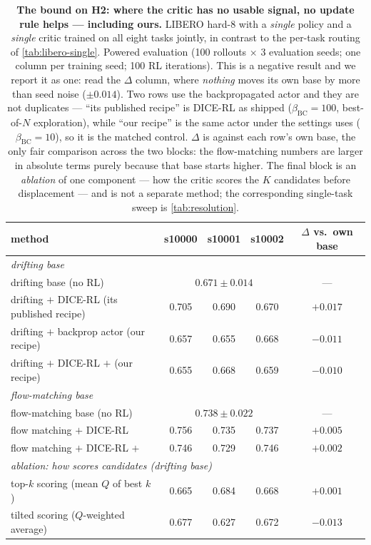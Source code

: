 \begin{table}[h]
\centering
\caption{\textbf{The bound on H2: where the critic has no usable signal,
no update rule helps --- including ours.} LIBERO hard-8 with a
\emph{single} policy and a \emph{single} critic trained on all eight tasks
jointly, in contrast to the per-task routing of \cref{tab:libero-single}.
Powered evaluation (100 rollouts $\times$ 3 evaluation seeds; one column per
training seed; 100 RL iterations). This is a negative result and we report it
as one: read the $\Delta$ column, where \emph{nothing} moves its own base by
more than seed noise ($\pm 0.014$). Two rows use the backpropagated actor and
they are not duplicates --- ``its published recipe'' is DICE-RL as shipped
($\beta_{\mathrm{BC}}{=}100$, best-of-$N$ exploration), while ``our recipe''
is the same actor under the settings \method{} uses
($\beta_{\mathrm{BC}}{=}10$), so it is the matched control. $\Delta$ is
against each row's own base, the only fair comparison across the two blocks:
the flow-matching numbers are larger in absolute terms purely because that
base starts higher. The final block is an \emph{ablation} of one component ---
how the critic scores the $K$ candidates before displacement --- and is not a
separate method; the corresponding single-task sweep is
\cref{tab:resolution}.}
\label{tab:libero}
\small
\begin{tabular}{lcccc}
\toprule
method & s10000 & s10001 & s10002 & $\Delta$ vs.\ own base \\
\midrule
\multicolumn{5}{l}{\emph{drifting base}} \\
drifting base (no RL)                        & \multicolumn{3}{c}{$0.671 \pm 0.014$} & --- \\
drifting $+$ DICE-RL (its published recipe)  & 0.705 & 0.690 & 0.670 & $+0.017$ \\
drifting $+$ backprop actor (our recipe)     & 0.657 & 0.655 & 0.668 & $-0.011$ \\
drifting $+$ DICE-RL $+$ \method{} (our recipe) & 0.655 & 0.668 & 0.659 & $-0.010$ \\
\midrule
\multicolumn{5}{l}{\emph{flow-matching base}} \\
flow-matching base (no RL)                   & \multicolumn{3}{c}{$0.738 \pm 0.022$} & --- \\
flow matching $+$ DICE-RL                    & 0.756 & 0.735 & 0.737 & $+0.005$ \\
flow matching $+$ DICE-RL $+$ \method{}      & 0.746 & 0.729 & 0.746 & $+0.002$ \\
\midrule
\multicolumn{5}{l}{\emph{ablation: how \method{} scores candidates (drifting base)}} \\
\quad top-$k$ scoring (mean $Q$ of best $k$) & 0.665 & 0.684 & 0.668 & $+0.001$ \\
\quad tilted scoring ($Q$-weighted average)  & 0.677 & 0.627 & 0.672 & $-0.013$ \\
\bottomrule
\end{tabular}
\end{table}

